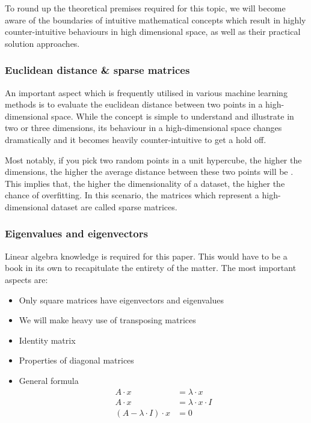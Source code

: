 
To round up the theoretical premises required for this topic, we will become aware of the boundaries of intuitive mathematical concepts which result in highly counter-intuitive behaviours in high dimensional space, as well as their practical solution approaches.

\subsubsection{Euclidean distance \& sparse matrices}

An important aspect which is frequently utilised in various machine learning methods is to evaluate the euclidean distance between two points in a high-dimensional space.
While the concept is simple to understand and illustrate in two or three dimensions, its behaviour in a high-dimensional space changes dramatically and it becomes heavily counter-intuitive to get a hold off.

Most notably, if you pick two random points in a unit hypercube, the higher the dimensions, the higher the average distance between these two points will be \cite{HandsOnMLCh8}.
This implies that, the higher the dimensionality of a dataset, the higher the chance of overfitting.
In this scenario, the matrices which represent a high-dimensional dataset are called sparse matrices.

\vspace{2mm}



\subsubsection{Eigenvalues and eigenvectors}

Linear algebra knowledge is required for this paper.
This would have to be a book in its own to recapitulate the entirety of the matter.
The most important aspects are:

\begin{itemize}
	\item Only square matrices have eigenvectors and eigenvalues
	\item We will make heavy use of transposing matrices
	\item Identity matrix
	\item Properties of diagonal matrices
	\item General formula
	\begin{align}
		\label{formula:one}
		A \cdot x &= \lambda \cdot x 
		\\
		\label{formula:two}
		A \cdot x &= \lambda \cdot x \cdot I
		\\
		\label{formula:three}
		(A - \lambda \cdot I)\cdot x &= 0
	\end{align}
\end{itemize}



